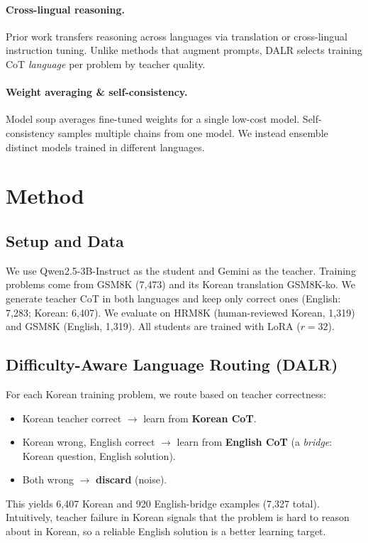 \documentclass[11pt]{article}
\begin{document}
\paragraph{Cross-lingual reasoning.} %
Prior work transfers reasoning across languages via translation or
cross-lingual instruction tuning. Unlike methods that augment prompts,
DALR selects training CoT \emph{language} per problem by teacher quality.

\paragraph{Weight averaging \& self-consistency.}
Model soup \citep{wortsman2022soup} averages fine-tuned weights for a
single low-cost model. Self-consistency \citep{wang2022selfconsistency}
samples multiple chains from one model. We instead ensemble distinct
models trained in different languages.

\section{Method}
\label{sec:method}

\subsection{Setup and Data}
\label{sec:data}
We use Qwen2.5-3B-Instruct as the student and Gemini as the teacher.
Training problems come from GSM8K (7{,}473) and its Korean translation
GSM8K-ko. We generate teacher CoT in both languages and keep only
correct ones (English: 7{,}283; Korean: 6{,}407). We evaluate on HRM8K
(human-reviewed Korean, 1{,}319) and GSM8K (English, 1{,}319).
All students are trained with LoRA ($r{=}32$).

\subsection{Difficulty-Aware Language Routing (DALR)}
\label{sec:dalr}
For each Korean training problem, we route based on teacher correctness:
\begin{itemize}
  \item Korean teacher correct $\rightarrow$ learn from \textbf{Korean CoT}.
  \item Korean wrong, English correct $\rightarrow$ learn from
  \textbf{English CoT} (a \emph{bridge}: Korean question, English solution).
  \item Both wrong $\rightarrow$ \textbf{discard} (noise).
\end{itemize}
This yields 6{,}407 Korean and 920 English-bridge examples (7{,}327
total). Intuitively, teacher failure in Korean signals that the problem
is hard to reason about in Korean, so a reliable English solution is a
better learning target.
\end{document}
